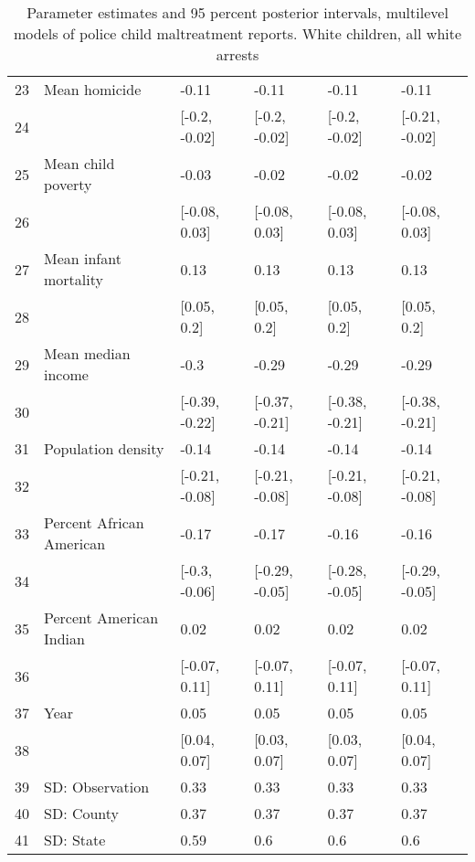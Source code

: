 \begin{table}[ht]
\begin{tabular}{rlllll}
  23 & Mean homicide & -0.11 & -0.11 & -0.11 & -0.11 \\ 
  24 &  & [-0.2, -0.02] & [-0.2, -0.02] & [-0.2, -0.02] & [-0.21, -0.02] \\ 
  25 & Mean child poverty & -0.03 & -0.02 & -0.02 & -0.02 \\ 
  26 &  & [-0.08, 0.03] & [-0.08, 0.03] & [-0.08, 0.03] & [-0.08, 0.03] \\ 
  27 & Mean infant mortality & 0.13 & 0.13 & 0.13 & 0.13 \\ 
  28 &  & [0.05, 0.2] & [0.05, 0.2] & [0.05, 0.2] & [0.05, 0.2] \\ 
  29 & Mean median income & -0.3 & -0.29 & -0.29 & -0.29 \\ 
  30 &  & [-0.39, -0.22] & [-0.37, -0.21] & [-0.38, -0.21] & [-0.38, -0.21] \\ 
  31 & Population density & -0.14 & -0.14 & -0.14 & -0.14 \\ 
  32 &  & [-0.21, -0.08] & [-0.21, -0.08] & [-0.21, -0.08] & [-0.21, -0.08] \\ 
  33 & Percent African American & -0.17 & -0.17 & -0.16 & -0.16 \\ 
  34 &  & [-0.3, -0.06] & [-0.29, -0.05] & [-0.28, -0.05] & [-0.29, -0.05] \\ 
  35 & Percent American Indian & 0.02 & 0.02 & 0.02 & 0.02 \\ 
  36 &  & [-0.07, 0.11] & [-0.07, 0.11] & [-0.07, 0.11] & [-0.07, 0.11] \\ 
  37 & Year & 0.05 & 0.05 & 0.05 & 0.05 \\ 
  38 &  & [0.04, 0.07] & [0.03, 0.07] & [0.03, 0.07] & [0.04, 0.07] \\ 
  39 & SD: Observation & 0.33 & 0.33 & 0.33 & 0.33 \\ 
  40 & SD: County & 0.37 & 0.37 & 0.37 & 0.37 \\ 
  41 & SD: State & 0.59 & 0.6 & 0.6 & 0.6 \\ 
   \hline
\end{tabular}
\caption{Parameter estimates and 95 percent posterior intervals, multilevel models of 
             police child maltreatment reports. White children, all white arrests} 
\end{table}
